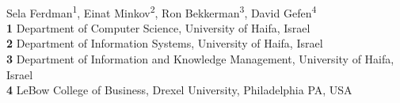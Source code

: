 \documentclass[10pt,letterpaper]{article}
\date{}
\begin{document}
\vspace*{0.2in}

\begin{flushleft}
{\Large
\textbf{} %
}
\newline
\\
Sela Ferdman\textsuperscript{1},
Einat Minkov\textsuperscript{2},
Ron Bekkerman\textsuperscript{3},
David Gefen\textsuperscript{4}
\\
\bigskip
\textbf{1} Department of Computer Science, University of Haifa, Israel
\\
\textbf{2} Department of Information Systems, University of Haifa, Israel
\\
\textbf{3} Department of Information and Knowledge Management, University of Haifa, Israel
\\
\textbf{4} LeBow College of Business, Drexel University, Philadelphia PA, USA
\\
\bigskip

% 
%






\end{flushleft}
\end{document}
